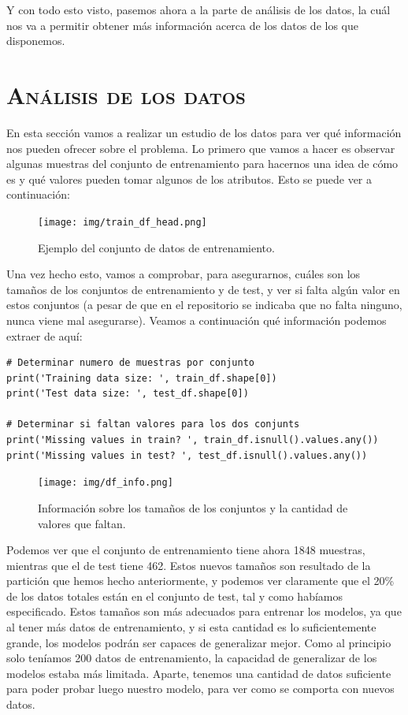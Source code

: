 \documentclass[11pt,a4paper]{article}
\begin{document}
Y con todo esto visto, pasemos ahora a la parte de análisis de los datos, la cuál nos va a permitir obtener más información acerca de
los datos de los que disponemos.

\newpage

\section{\textsc{Análisis de los datos}}

En esta sección vamos a realizar un estudio de los datos para ver qué información nos pueden ofrecer sobre el problema. Lo primero que
vamos a hacer es observar algunas muestras del conjunto de entrenamiento para hacernos una idea de cómo es y qué valores pueden tomar
algunos de los atributos. Esto se puede ver a continuación:

\begin{figure}[H]
    \centering
    \texttt{[image: img/train\_df\_head.png]}
    \caption{Ejemplo del conjunto de datos de entrenamiento.}
    \label{fig:train-df}
\end{figure}

Una vez hecho esto, vamos a comprobar, para asegurarnos, cuáles son los tamaños de los conjuntos de entrenamiento y de test, y ver
si falta algún valor en estos conjuntos (a pesar de que en el repositorio se indicaba que no falta ninguno, nunca viene mal asegurarse).
Veamos a continuación qué información podemos extraer de aquí:

\begin{lstlisting}
# Determinar numero de muestras por conjunto
print('Training data size: ', train_df.shape[0])
print('Test data size: ', test_df.shape[0])

# Determinar si faltan valores para los dos conjunts
print('Missing values in train? ', train_df.isnull().values.any())
print('Missing values in test? ', test_df.isnull().values.any())
\end{lstlisting}

\begin{figure}[H]
    \centering
    \texttt{[image: img/df\_info.png]}
    \caption{Información sobre los tamaños de los conjuntos y la cantidad de valores que faltan.}
    \label{fig:train-test-stat}
\end{figure}

Podemos ver que el conjunto de entrenamiento tiene ahora 1848 muestras, mientras que el de test tiene 462. Estos nuevos tamaños son
resultado de la partición que hemos hecho anteriormente, y podemos ver claramente que el 20\% de los datos totales están en el
conjunto de test, tal y como habíamos especificado. Estos tamaños son más adecuados para entrenar los modelos, ya que al tener más
datos de entrenamiento, y si esta cantidad es lo suficientemente grande, los modelos podrán ser capaces de generalizar mejor. Como
al principio solo teníamos 200 datos de entrenamiento, la capacidad de generalizar de los modelos estaba más limitada. Aparte, tenemos
una cantidad de datos suficiente para poder probar luego nuestro modelo, para ver como se comporta con nuevos datos.
\end{document}
